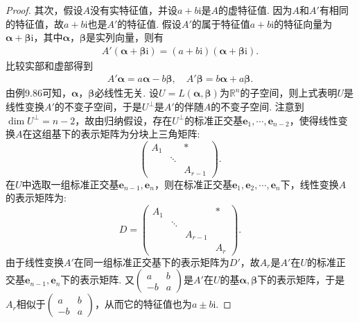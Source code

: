 \documentclass[../../main.tex]{subfiles}
\begin{document}
\begin{proof}
其次，假设\(A\)没有实特征值，并设\(a + b\mathrm{i}\)是\(A\)的虚特征值. 因为\(A\)和\(A'\)有相同的特征值，故\(a + b\mathrm{i}\)也是\(A'\)的特征值. 假设\(A'\)的属于特征值\(a + b\mathrm{i}\)的特征向量为\(\boldsymbol{\alpha}+ \boldsymbol{\beta}\mathrm{i}\)，其中\(\boldsymbol{\alpha}\)，\(\boldsymbol{\beta}\)是实列向量，则有
\begin{align*}
A'(\boldsymbol{\alpha}+ \boldsymbol{\beta}\mathrm{i})=(a + b\mathrm{i})(\boldsymbol{\alpha}+ \boldsymbol{\beta}\mathrm{i}).
\end{align*}
比较实部和虚部得到
\begin{align*}
A'\boldsymbol{\alpha}=a\boldsymbol{\alpha}-b\boldsymbol{\beta},\quad A'\boldsymbol{\beta}=b\boldsymbol{\alpha}+a\boldsymbol{\beta}.
\end{align*}
由例9.86可知，\(\boldsymbol{\alpha}\)，\(\boldsymbol{\beta}\)必线性无关. 设\(U = L(\boldsymbol{\alpha},\boldsymbol{\beta})\)为\(\mathbb{R}^n\)的子空间，则上式表明\(U\)是线性变换\(A'\)的不变子空间，于是\(U^\perp\)是\(A'\)的伴随\(A\)的不变子空间. 注意到\(\dim U^\perp=n - 2\)，故由归纳假设，存在\(U^\perp\)的标准正交基\(\boldsymbol{e}_1,\cdots,\boldsymbol{e}_{n - 2}\)，使得线性变换\(A\)在这组基下的表示矩阵为分块上三角矩阵:
\[
\begin{pmatrix}
A_1 & & * \\
& \ddots & \\
& & A_{r - 1}
\end{pmatrix}.
\]
在\(U\)中选取一组标准正交基\(\boldsymbol{e}_{n - 1},\boldsymbol{e}_n\)，则在标准正交基\(\boldsymbol{e}_1,\boldsymbol{e}_2,\cdots,\boldsymbol{e}_n\)下，线性变换\(A\)的表示矩阵为:
\[
D = 
\begin{pmatrix}
A_1 & & & * \\
& \ddots & & \\
& & A_{r - 1} & \\
& & & A_r
\end{pmatrix}.
\]
由于线性变换\(A'\)在同一组标准正交基下的表示矩阵为\(D'\)，故\(A_r\)是\(A'\)在\(U\)的标准正交基\(\boldsymbol{e}_{n - 1},\boldsymbol{e}_n\)下的表示矩阵. 又\(\begin{pmatrix}a&b\\-b&a\end{pmatrix}\)是\(A'\)在\(U\)的基\(\boldsymbol{\alpha},\boldsymbol{\beta}\)下的表示矩阵，于是\(A_r\)相似于\(\begin{pmatrix}a&b\\-b&a\end{pmatrix}\)，从而它的特征值也为\(a\pm b\mathrm{i}\). 

\end{proof}
\end{document}

